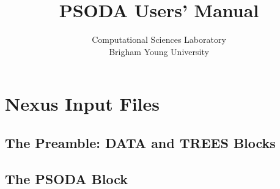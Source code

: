 \documentclass{book}
\title{PSODA Users' Manual}
\author{Computational Sciences Laboratory \\ Brigham Young University}
\begin{document}
\maketitle

\part{Nexus Input Files}
\chapter{The Preamble: DATA and TREES Blocks}
\chapter{The PSODA Block}
 
\end{document}
